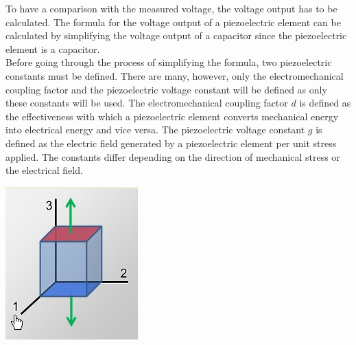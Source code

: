 To have a comparison with the measured voltage, the voltage output has to be calculated. The formula for the voltage output of a piezoelectric element can be calculated by simplifying the voltage output of a capacitor since the piezoelectric element is a capacitor.\cite{F3lixTutorial2023}\\
Before going through the process of simplifying the formula, two piezoelectric constants must be defined. There are many, however, only the electromechanical coupling factor and the piezoelectric voltage constant will be defined as only these constants will be used. The electromechanical coupling factor $d$ is defined as the effectiveness with which a piezoelectric element converts mechanical energy into electrical energy and vice versa. The piezoelectric voltage constant $g$ is defined as the electric field generated by a piezoelectric element per unit stress applied. The constants differ depending on the direction of mechanical stress or the electrical field.\cite{F3lixTutorial2023}\\
\begin{minipage}{0.33\textwidth}
    \vspace{0.5cm}
    \includegraphics[width=\textwidth]{./Figure_5.jpg}
    \label{fig:Expansion Mode of the Piezoelectric Element}
\end{minipage}
